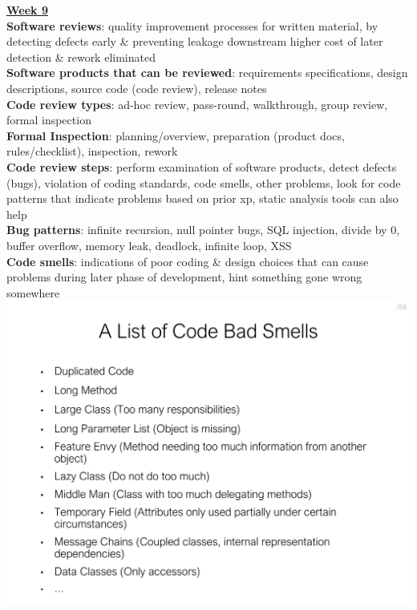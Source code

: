 \documentclass[a4paper]{article}
\begin{document}
\begin{multicols}{3}
        \vfill\null\columnbreak\noindent\underline{\textbf{Week 9}}\\
        \textbf{Software reviews}: quality improvement processes for written material, by detecting defects early \& preventing leakage downstream higher cost of later detection \& rework eliminated\\
        \textbf{Software products that can be reviewed}: requirements specifications, design descriptions, source code (code review), release notes\\
        \textbf{Code review types}: ad-hoc review, pass-round, walkthrough, group review, formal inspection\\
        \textbf{Formal Inspection}: planning/overview, preparation (product docs, rules/checklist), inspection, rework\\
        \textbf{Code review steps}: perform examination of software products, detect defects (bugs), violation of coding standards, code smells, other problems, look for code patterns that indicate problems based on prior xp, static analysis tools can also help\\
        \textbf{Bug patterns}: infinite recursion, null pointer bugs, SQL injection, divide by 0, buffer overflow, memory leak, deadlock, infinite loop, XSS\\
        \textbf{\textbf{Code smells}}: indications of poor coding \& design choices that can cause problems during later phase of development, hint something gone wrong somewhere
        \includegraphics[width=\linewidth]{418.pdf}\\

\end{multicols}
\end{document}
